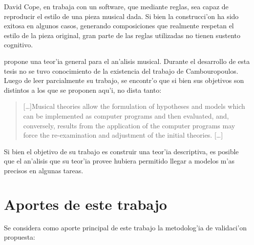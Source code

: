 David Cope, en trabaja con un software, que mediante reglas, sea capaz de reproducir el estilo de una pieza musical dada. Si bien 
la construcci'on ha sido exitosa en algunos casos, generando composiciones que realmente respetan el estilo de la pieza original, gran
parte de las reglas utilizadas no tienen sustento cognitivo.


\cite{Cambouropoulos98} propone una teor'ia general para el an'alisis musical. Durante el desarrollo de esta tesis no se tuvo conocimiento de la existencia del trabajo de Cambouropoulos.
Luego de leer parcialmente su trabajo, se encontr'o que si bien sus objetivos son distintos a los que se proponen aqu'i, no dista tanto: 
\begin{quote}
[\ldots]Musical theories allow the formulation of hypotheses and models which can be implemented
as computer programs and then evaluated, and, conversely, results from the application of the
computer programs may force the re-examination and adjustment of the initial theories. [\ldots]
\end{quote} 
Si bien el objetivo de su trabajo es construir una teor'ia descriptiva, es posible que el an'alisis que su teor'ia provee hubiera permitido llegar a modelos m'as precisos 
en algunas tareas. 

%
%

\section{Aportes de este trabajo}
Se considera como aporte principal de este trabajo la metodolog'ia de validaci'on propuesta: 

